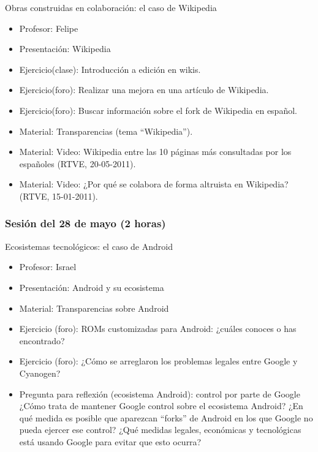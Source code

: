 \documentclass[a4paper,12pt]{article}
\begin{document}
Obras construidas en colaboración: el caso de Wikipedia


\begin{itemize}
\item Profesor: Felipe
\item Presentación: Wikipedia
\item Ejercicio(clase): Introducción a edición en wikis.
\item Ejercicio(foro): Realizar una mejora en una artículo de Wikipedia.
\item Ejercicio(foro): Buscar información sobre el fork de Wikipedia en español.
\item Material: Transparencias (tema ``Wikipedia'').
\item Material: Video: Wikipedia entre las 10 páginas más consultadas por los 
españoles (RTVE, 20-05-2011).
\item Material: Video: ¿Por qué se colabora de forma altruista en Wikipedia? 
(RTVE, 15-01-2011).
\end{itemize}

\subsubsection{Sesión del 28 de mayo (2 horas)}

Ecosistemas tecnológicos: el caso de Android


\begin{itemize}
\item Profesor: Israel
\item Presentación: Android y su ecosistema
\item Material: Transparencias sobre Android
\item Ejercicio (foro): ROMs customizadas para Android: ¿cuáles
  conoces o has encontrado?
\item Ejercicio (foro): ¿Cómo se arreglaron los problemas legales
  entre Google y Cyanogen?
\item Pregunta para reflexión (ecosistema Android): control por parte de Google \\
  ¿Cómo trata de mantener Google control sobre el ecosistema Android? ¿En qué medida es posible que aparezcan ``forks'' de Android en los que Google no pueda ejercer ese control? ¿Qué medidas legales, económicas y tecnológicas está usando Google para evitar que esto ocurra?
\end{itemize}
\end{document}
